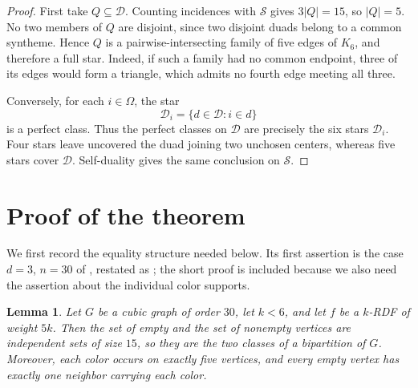 \documentclass[11pt]{amsart}
\newtheorem{lemma}[theorem]{Lemma}
\begin{document}
\begin{proof}
First take $Q\subseteq\mathcal D$. Counting incidences with
$\mathcal S$ gives $3|Q|=15$, so $|Q|=5$. No two members of $Q$ are
disjoint, since two disjoint duads belong to a common syntheme. Hence
$Q$ is a pairwise-intersecting family of five edges of $K_6$, and
therefore a full star. Indeed, if such a family had no common endpoint,
three of its edges would form a triangle, which admits no fourth edge
meeting all three.

Conversely, for each $i\in\Omega$, the star
\[
  \mathcal D_i=\{d\in\mathcal D:i\in d\}
\]
is a perfect class. Thus the perfect classes on $\mathcal D$ are
precisely the six stars $\mathcal D_i$. Four stars leave uncovered the
duad joining two unchosen centers, whereas five stars cover
$\mathcal D$. Self-duality gives the same conclusion on $\mathcal S$.
\end{proof}

\section{Proof of the theorem}\label{sec:proof}

We first record the equality structure needed below. Its first assertion
is the case $d=3$, $n=30$ of \cite[Theorem~3.1]{Kuzman2020}, restated as
\cite[Theorem~2.1(ii)]{Kuzman2025}; the short proof is included because
we also need the assertion about the individual color supports.

\begin{lemma}\label{lem:equality}
Let $G$ be a cubic graph of order $30$, let $k<6$, and let $f$ be a
$k$-RDF of weight $5k$. Then the set of empty and the set of nonempty
vertices are independent sets of size $15$, so they are the two classes
of a bipartition of $G$. Moreover, each color occurs on exactly
five vertices, and every empty vertex has exactly one neighbor carrying
each color.
\end{lemma}
\end{document}
